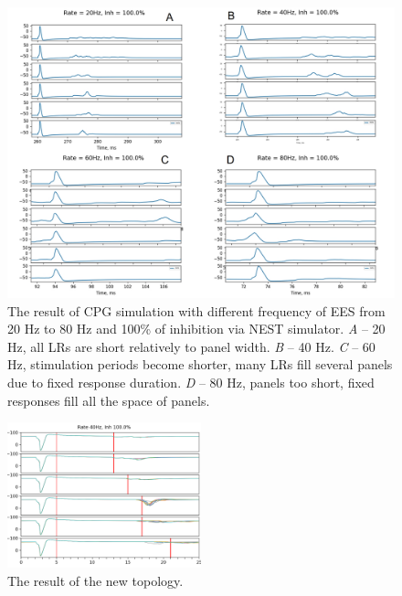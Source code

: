\documentclass[]{elsarticle}
\begin{document}
\begin{figure}[ht!]
	\centering
	\includegraphics[width=1.0\textwidth]{results/summary_rates.jpg}
	\caption{The result of CPG simulation with different frequency of EES from 20 Hz to 80 Hz and 100\% of inhibition via NEST simulator. 
    \emph{A} -- 20 Hz, all LRs are short relatively to panel width. 
    \emph{B} -- 40 Hz. 
    \emph{C} -- 60 Hz, stimulation periods become shorter, many LRs fill several panels due to fixed response duration. 
    \emph{D} -- 80 Hz, panels too short, fixed responses fill all the space of panels.}
    \label{fig:nest_summary_rates}
\end{figure}

\begin{figure}[ht!]
	\centering
	\includegraphics[width=0.5\textwidth]{results/slices40Hz-1_0Inh-6sublevels_mean.png}
	\caption{The result of the new topology.
    }
    \label{fig:nest_new_results}
\end{figure}


\end{document}
